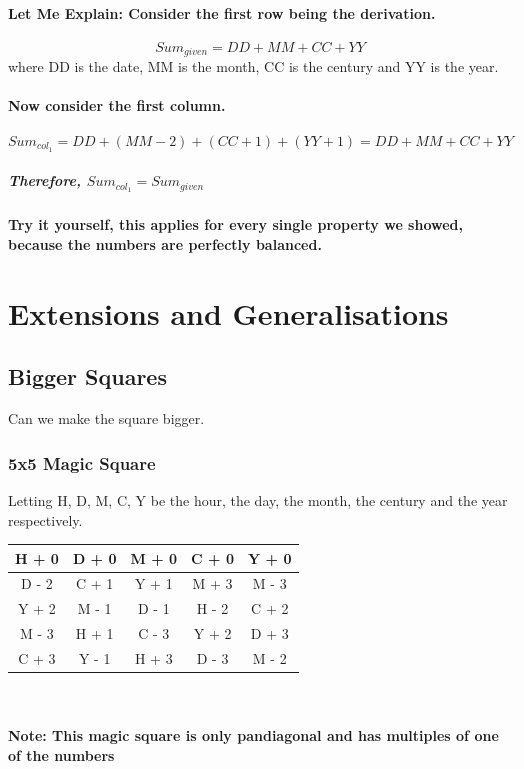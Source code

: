 \documentclass{article}
\begin{document}
\paragraph{
Let Me Explain: Consider the first row being the derivation.
}
\begin{equation*}
Sum_{given} = DD + MM + CC + YY
\end{equation*}
where DD is the date, MM is the month, CC is the century and YY is the year.

\paragraph{Now consider the first column.}
\begin{equation*}
Sum_{col_1} = DD + (MM-2) + (CC+1) + (YY+1) = DD + MM + CC + YY
\end{equation*}
\subparagraph{Therefore, $Sum_{col_1} = Sum_{given}$}

\paragraph{Try it yourself, this applies for every single property we showed, because the numbers are perfectly balanced.}

\newpage
\section{Extensions and Generalisations}

\subsection{Bigger Squares}
Can we make the square bigger.
    \subsubsection{5x5 Magic Square}
        Letting H, D, M, C, Y be the hour, the day, the month, the century and the year respectively. \\
        \def\arraystretch{2}
        \begin{center}
            \begin{tabular}{|c|c|c|c|c|}
                \hline
                 H + 0 & D + 0 & M + 0 & C + 0 & Y + 0  \\
                 \hline
                 D - 2 & C + 1 & Y + 1 & M + 3 & M - 3 \\
                 \hline
                 Y + 2 & M - 1 & D - 1 & H - 2 & C + 2 \\
                 \hline
                 M - 3 & H + 1 & C - 3 & Y + 2 & D + 3 \\
                 \hline
                 C + 3 & Y - 1 & H + 3 & D - 3 & M - 2 \\
                 \hline
            \end{tabular}\\
        \textbf{\\ Note: This magic square is only pandiagonal and has multiples of one of the numbers}
        \end{center}
\end{document}
